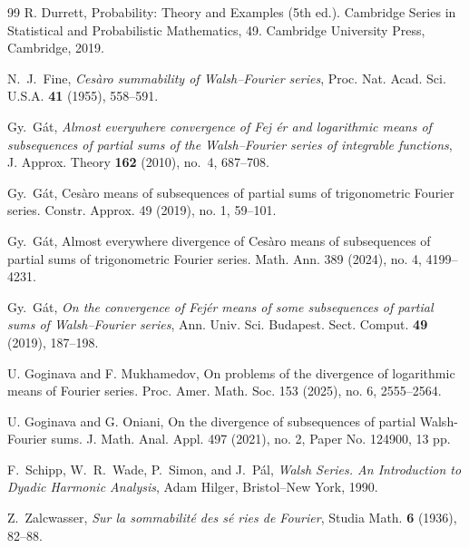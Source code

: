\documentclass[11pt]{amsart}
\numberwithin{equation}{section}
\theoremstyle{remark}
\begin{document}
\begin{thebibliography}{99}
 R. Durrett,  Probability: Theory and Examples (5th ed.).
Cambridge Series in Statistical and Probabilistic Mathematics, 49. Cambridge
University Press, Cambridge, 2019.

 N.~J.~Fine, \emph{Ces\`{a}ro summability of Walsh--Fourier
series}, Proc. Nat. Acad. Sci. U.S.A. \textbf{41} (1955), 558--591.

 Gy.~G\'{a}t, \emph{Almost everywhere convergence of Fej%
\'{e}r and logarithmic means of subsequences of partial sums of the
Walsh--Fourier series of integrable functions}, J. Approx. Theory \textbf{162%
} (2010), no.~4, 687--708.

 Gy.~G\'{a}t,  Ces\`{a}ro means of subsequences of
partial sums of trigonometric Fourier series. Constr. Approx. 49 (2019), no.
1, 59--101.

 Gy.~G\'{a}t, Almost everywhere divergence of Ces\`{a}ro
means of subsequences of partial sums of trigonometric Fourier series. Math.
Ann. 389 (2024), no. 4, 4199--4231.

 Gy.~G\'{a}t, \emph{On the convergence of Fej\'{e}r means
of some subsequences of partial sums of Walsh--Fourier series}, Ann. Univ.
Sci. Budapest. Sect. Comput. \textbf{49} (2019), 187--198.

 U. Goginava and F. Mukhamedov, On problems of the
divergence of logarithmic means of Fourier series. Proc. Amer. Math. Soc.
153 (2025), no. 6, 2555--2564. 

 U. Goginava and G. Oniani, On the divergence of
subsequences of partial Walsh-Fourier sums. J. Math. Anal. Appl. 497 (2021),
no. 2, Paper No. 124900, 13 pp.

 F.~Schipp, W.~R.~Wade, P.~Simon, and J.~P\'{a}l, \emph{%
Walsh Series. An Introduction to Dyadic Harmonic Analysis}, Adam Hilger,
Bristol--New York, 1990.

 Z.~Zalcwasser, \emph{Sur la sommabilit\'{e} des s\'{e}%
ries de Fourier}, Studia Math. \textbf{6} (1936), 82--88.
\end{thebibliography}
\end{document}
